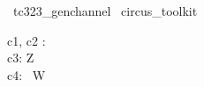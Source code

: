 
\begin{zsection}
  \SECTION\ tc323\_genchannel \parents\ circus\_toolkit
\end{zsection}

\begin{circus}
    \circchannel [X, Y] c1, c2 : \nat \\
    \circchannel[Z] c3: \nat \cross Z \\
    \circchannel [W] c4: \power~W
\end{circus}



